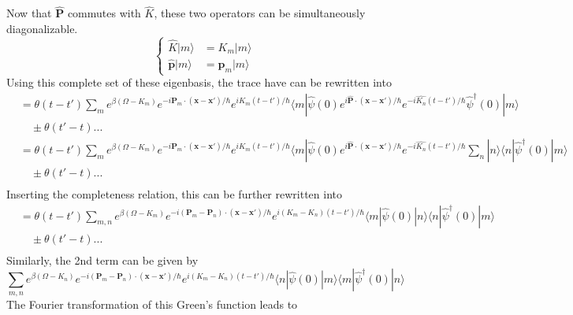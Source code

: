 Now that $\hat{\mathbf{P}}$ commutes with $\hat{K}$, these two operators can be simultaneously diagonalizable.
\[
\left\{
\begin{aligned}
\hat K |m\rangle &=K_m |m\rangle\\
\hat{\mathbf{p}} |m\rangle&=\mathbf{p}_m |m\rangle
\end{aligned}
\right.
\]
 Using this complete set of these eigenbasis, the trace have can be rewritten into
\[
\begin{aligned}
&=\theta(t-t') \sum_m e^{\beta (\Omega-K_m)} e^{-i\mathbf{P}_m\cdot (\mathbf{x}-\mathbf{x}')/\hbar} e^{i K_m(t-t')/\hbar} \langle m| \hat{\psi}(0) e^{i\hat{\mathbf P}\cdot (\mathbf{x}-\mathbf{x}')/\hbar} e^{-i \hat{K_n}(t-t')/\hbar} \hat\psi ^\dag(0) |m\rangle\\
&\quad \pm \theta(t'-t)...\\
&=\theta(t-t') \sum_m e^{\beta (\Omega-K_m)} e^{-i\mathbf{P}_m\cdot (\mathbf{x}-\mathbf{x}')/\hbar} e^{i K_m(t-t')/\hbar} \langle m| \hat{\psi}(0) e^{i\hat{\mathbf P}\cdot (\mathbf{x}-\mathbf{x}')/\hbar} e^{-i \hat{K_n}(t-t')/\hbar} \sum_n |n\rangle \langle n| \hat\psi ^\dag(0) |m\rangle\\
&\quad \pm \theta(t'-t)...\\
\end{aligned}
\]
 Inserting the completeness relation, this can be further rewritten into
\begin{equation}
\begin{aligned}
&=\theta(t-t') \sum_{m,n} e^{\beta (\Omega-K_m)} e^{-i(\mathbf{P}_m-\mathbf{P}_n) \cdot (\mathbf{x}-\mathbf{x}')/\hbar} e^{i (K_m-K_n)(t-t')/\hbar}  \langle m| \hat{\psi}(0)  |n\rangle \langle n| \hat\psi ^\dag(0) |m\rangle\\
&\quad \pm \theta(t'-t)...\\
\end{aligned}
\end{equation}
 Similarly, the 2nd term can be given by
\[
\sum_{m,n} e^{\beta (\Omega-K_n)} e^{-i(\mathbf{P}_m-\mathbf{P}_n) \cdot (\mathbf{x}-\mathbf{x}')/\hbar} e^{i (K_m-K_n)(t-t')/\hbar}  \langle n| \hat{\psi}(0)  |m\rangle \langle m| \hat\psi ^\dag(0) |n\rangle
\]
The Fourier transformation of this Green's function leads to
